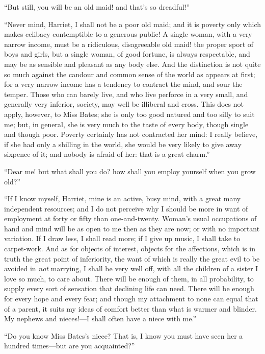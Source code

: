 ``But still, you will be an old maid! and that's so dreadful!''

``Never mind, Harriet, I shall not be a poor old maid; and it is
poverty only which makes celibacy contemptible to a generous public!
A single woman, with a very narrow income, must be a ridiculous,
disagreeable old maid! the proper sport of boys and girls,
but a single woman, of good fortune, is always respectable,
and may be as sensible and pleasant as any body else.  And the
distinction is not quite so much against the candour and common
sense of the world as appears at first; for a very narrow income
has a tendency to contract the mind, and sour the temper.
Those who can barely live, and who live perforce in a very small,
and generally very inferior, society, may well be illiberal and cross.
This does not apply, however, to Miss Bates; she is only too good
natured and too silly to suit me; but, in general, she is very
much to the taste of every body, though single and though poor.
Poverty certainly has not contracted her mind:  I really believe,
if she had only a shilling in the world, she would be very likely
to give away sixpence of it; and nobody is afraid of her:  that is a
great charm.''

``Dear me! but what shall you do? how shall you employ yourself
when you grow old?''

``If I know myself, Harriet, mine is an active, busy mind, with a great
many independent resources; and I do not perceive why I should be
more in want of employment at forty or fifty than one-and-twenty.
Woman's usual occupations of hand and mind will be as open to me then
as they are now; or with no important variation.  If I draw less,
I shall read more; if I give up music, I shall take to carpet-work.
And as for objects of interest, objects for the affections,
which is in truth the great point of inferiority, the want of which
is really the great evil to be avoided in \emph{not} marrying, I shall
be very well off, with all the children of a sister I love so much,
to care about.  There will be enough of them, in all probability,
to supply every sort of sensation that declining life can need.
There will be enough for every hope and every fear; and though my
attachment to none can equal that of a parent, it suits my ideas
of comfort better than what is warmer and blinder.  My nephews
and nieces!---I shall often have a niece with me.''

``Do you know Miss Bates's niece?  That is, I know you must have
seen her a hundred times---but are you acquainted?''

